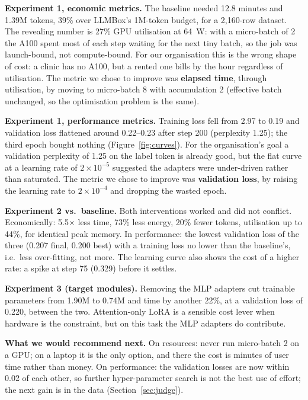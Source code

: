 \documentclass[11pt]{article}
\begin{document}
\textbf{Experiment 1, economic metrics.} The baseline needed 12.8 minutes and 1.39M tokens, 39\% over LLMBox's 1M-token budget, for a 2,160-row dataset. The revealing number is 27\% GPU utilisation at 64~W: with a micro-batch of 2 the A100 spent most of each step waiting for the next tiny batch, so the job was launch-bound, not compute-bound. For our organisation this is the wrong shape of cost: a clinic has no A100, but a rented one bills by the hour regardless of utilisation. The metric we chose to improve was \textbf{elapsed time}, through utilisation, by moving to micro-batch 8 with accumulation 2 (effective batch unchanged, so the optimisation problem is the same).

\textbf{Experiment 1, performance metrics.} Training loss fell from 2.97 to 0.19 and validation loss flattened around 0.22--0.23 after step 200 (perplexity 1.25); the third epoch bought nothing (Figure~\ref{fig:curves}). For the organisation's goal a validation perplexity of 1.25 on the label token is already good, but the flat curve at a learning rate of $2\times10^{-5}$ suggested the adapters were under-driven rather than saturated. The metric we chose to improve was \textbf{validation loss}, by raising the learning rate to $2\times10^{-4}$ and dropping the wasted epoch.

\textbf{Experiment 2 vs.\ baseline.} Both interventions worked and did not conflict. Economically: 5.5$\times$ less time, 73\% less energy, 20\% fewer tokens, utilisation up to 44\%, for identical peak memory. In performance: the lowest validation loss of the three (0.207 final, 0.200 best) with a training loss no lower than the baseline's, i.e.\ less over-fitting, not more. The learning curve also shows the cost of a higher rate: a spike at step 75 (0.329) before it settles.

\textbf{Experiment 3 (target modules).} Removing the MLP adapters cut trainable parameters from 1.90M to 0.74M and time by another 22\%, at a validation loss of 0.220, between the two. Attention-only LoRA is a sensible cost lever when hardware is the constraint, but on this task the MLP adapters do contribute.

\textbf{What we would recommend next.} On resources: never run micro-batch 2 on a GPU; on a laptop it is the only option, and there the cost is minutes of user time rather than money. On performance: the validation losses are now within 0.02 of each other, so further hyper-parameter search is not the best use of effort; the next gain is in the data (Section~\ref{sec:judge}).
\end{document}
